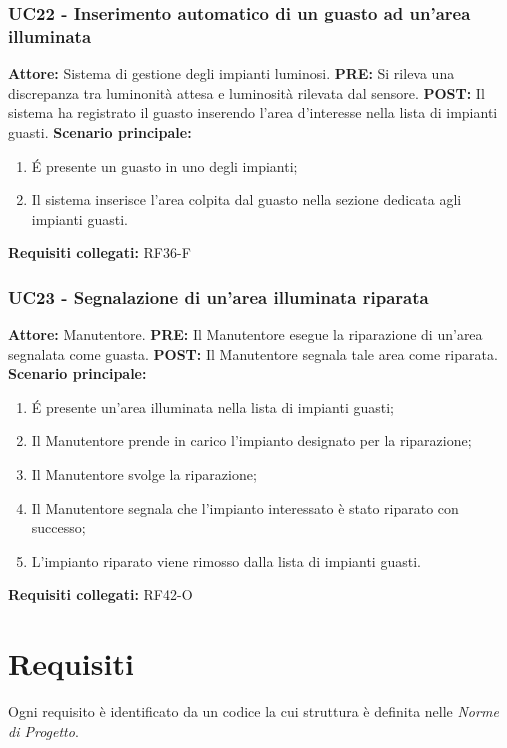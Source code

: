 \documentclass[a4paper, 12pt]{article}
\begin{document}
\subsubsection{UC22 - Inserimento automatico di un guasto ad un'area illuminata}
\textbf{Attore:} Sistema di gestione degli impianti luminosi.\newline
\textbf{PRE:} Si rileva una discrepanza tra luminonità attesa e luminosità rilevata dal sensore.\newline
\textbf{POST:} Il sistema ha registrato il guasto inserendo l'area d'interesse nella lista di impianti guasti. \newline
\textbf{Scenario principale:}
\begin{enumerate}
    \item \'E presente un guasto in uno degli impianti;
    \item Il sistema inserisce l'area colpita dal guasto nella sezione dedicata agli impianti guasti.
\end{enumerate}
\textbf{Requisiti collegati:} RF36-F\newline

\subsubsection{UC23 - Segnalazione di un'area illuminata riparata}
\textbf{Attore:} Manutentore.\newline
\textbf{PRE:} Il Manutentore esegue la riparazione di un'area segnalata come guasta.\newline
\textbf{POST:} Il Manutentore segnala tale area come riparata. \newline
\textbf{Scenario principale:}
\begin{enumerate}
    \item \'E presente un'area illuminata nella lista di impianti guasti;
    \item Il Manutentore prende in carico l'impianto designato per la riparazione;
    \item Il Manutentore svolge la riparazione;
    \item Il Manutentore segnala che l'impianto interessato è stato riparato con successo;
    \item L'impianto riparato viene rimosso dalla lista di impianti guasti.
\end{enumerate}
\textbf{Requisiti collegati:} RF42-O\newline

\newpage
\section{Requisiti}
Ogni requisito è identificato da un codice la cui struttura è definita nelle \textit{Norme di Progetto}.
\end{document}
